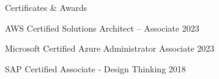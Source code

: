 \begin{rSection}{Certificates \& Awards}
    \begin{rOSubsection}
        {AWS Certified Solutions Architect – Associate}
        {2023}
    \end{rOSubsection}

    \begin{rOSubsection}
        {Microsoft Certified Azure Administrator Associate}
        {2023}
    \end{rOSubsection}

    \begin{rOSubsection}
        {SAP Certified Associate - Design Thinking}
        {2018}
    \end{rOSubsection}
\end{rSection}